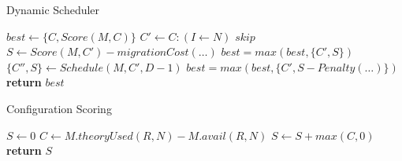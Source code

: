 
\begin{algorithm}[H]
\caption{Dynamic Scheduler}
\label{algo:sched}
\footnotesize
\begin{algorithmic}
    \State $best \gets \{C,Score(M,C)\}$%
        \State $C' \gets C : (I \gets N)$
            \State $skip$
        \EndIf
        \State $S \gets Score(M,C') - migrationCost(\dots)$
        \State $best = max(best,\{C',S\})$
        \State $\{C'',S\} \gets Schedule(M,C',D-1)$
        \State $best = max(best,\{C', S - Penalty(\dots)\})$
        \EndIf
    \EndFor
    \State \textbf{return} $best$
\EndProcedure
\end{algorithmic}
\normalsize
\end{algorithm}

\begin{algorithm}[H]
\caption{Configuration Scoring}
\label{algo:score}
\footnotesize
\begin{algorithmic}
    \State $S \gets 0$
        \State $C \gets M.theoryUsed(R,N) - M.avail(R,N)$
        \State $S \gets S + max(C,0)$
    \EndFor
    \State \textbf{return} $S$
\EndProcedure
\end{algorithmic}
\normalsize
\end{algorithm}
